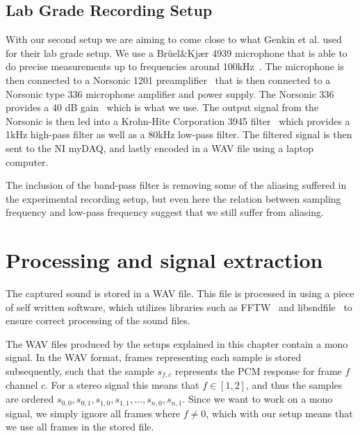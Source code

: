 \subsection{Lab Grade Recording Setup}\label{chp3:sec:bruel_kjaer_configuration}
With our second setup we are aiming to come close to what Genkin et al. used for their lab grade setup.
We use a Brüel\&Kjær 4939 microphone that is able to do precise measurements up to frequencies around 100kHz~\cite{url:bk4939_spec}.
The microphone is then connected to a Norsonic 1201 preamplifier~\cite{url:norsonic1201_spec} that is then connected to a Norsonic type 336 microphone amplifier and power supply.
The Norsonic 336 provides a 40 dB gain~\cite{url:nor336_spec} which is what we use.
The output signal from the Norsonic is then led into a Krohn-Hite Corporation 3945 filter~\cite{url:krohn-hite3945_spec} which provides a 1kHz high-pass filter as well as a 80kHz low-pass filter.
The filtered signal is then sent to the \gls{NI} myDAQ, and lastly encoded in a WAV file using a laptop computer. 

The inclusion of the band-pass filter is removing some of the aliasing suffered in the experimental recording setup, but even here the relation between sampling frequency and low-pass frequency suggest that we still suffer from aliasing.


\section{Processing and signal extraction}\label{chp3:sec:processing_signal_extraction}
The captured sound is stored in a WAV file.
This file is processed in using a piece of self written software, which utilizes libraries such as FFTW~\cite{url:fftw} and libsndfile~\cite{url:libsndfile} to ensure correct processing of the sound files.

The WAV files produced by the setups explained in this chapter contain a mono signal. In the WAV format, frames representing each sample is stored subsequently, such that the sample \( s_{f,c} \) represents the \gls{PCM} response for frame \( f \) channel \( c \). 
For a stereo signal this means that \( f \in \left [ 1, 2 \right ] \), and thus the samples are ordered  \( s_{0,0}, s_{0,1}, s_{1,0}, s_{1,1}, ... , s_{n,0}, s_{n,1} \).
Since we want to work on a mono signal, we simply ignore all frames where \( f \neq 0 \), which with our setup means that we use all frames in the stored file.

